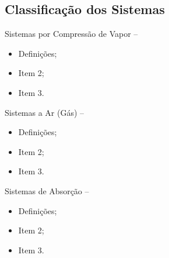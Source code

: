 \subsection{Classificação dos Sistemas}

    \begin{frame}[allowframebreaks]{Sistemas por Compressão de Vapor -- }\vspace*{-2em}
        \begin{itemize}
            \item<1-> Definições;
            \item<1-> Item 2;
            \item<1-> Item 3.
        \end{itemize}
    \end{frame}

    \begin{frame}[allowframebreaks]{Sistemas a Ar (Gás) -- }\vspace*{-2em}
        \begin{itemize}
            \item<1-> Definições;
            \item<1-> Item 2;
            \item<1-> Item 3.
        \end{itemize}
    \end{frame}

    \begin{frame}[allowframebreaks]{Sistemas de Absorção -- }\vspace*{-2em}
        \begin{itemize}
            \item<1-> Definições;
            \item<1-> Item 2;
            \item<1-> Item 3.
        \end{itemize}
    \end{frame}

